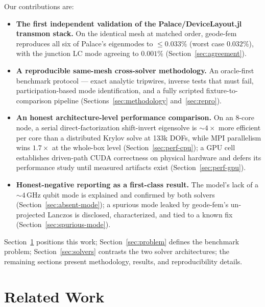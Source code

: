 \documentclass{anvil-paper}
\begin{document}
Our contributions are:
\begin{itemize}
  \item \textbf{The first independent validation of the Palace/DeviceLayout.jl
    transmon stack.} On the identical mesh at matched order, geode-fem
    reproduces all six of Palace's eigenmodes to $\leq 0.033\%$ (worst case
    $0.032\%$), with the junction LC mode agreeing to $0.001\%$
    (Section~\ref{sec:agreement}).
  \item \textbf{A reproducible same-mesh cross-solver methodology.} An
    oracle-first benchmark protocol --- exact analytic tripwires, inverse
    tests that must fail, participation-based mode identification, and a
    fully scripted fixture-to-comparison pipeline
    (Sections~\ref{sec:methodology} and~\ref{sec:repro}).
  \item \textbf{An honest architecture-level performance comparison.} On an
    8-core node, a serial direct-factorization shift-invert eigensolve is
    ${\sim}4\times$ more efficient per core than a distributed Krylov solve
    at 133k DOFs, while MPI parallelism wins $1.7\times$ at the whole-box
    level (Section~\ref{sec:perf-cpu}); a GPU cell establishes driven-path
    CUDA correctness on physical hardware and defers its performance study
    until measured artifacts exist (Section~\ref{sec:perf-gpu}).
  \item \textbf{Honest-negative reporting as a first-class result.} The
    model's lack of a ${\sim}4$\,GHz qubit mode is explained and confirmed
    by both solvers (Section~\ref{sec:absent-mode}); a spurious mode leaked
    by geode-fem's un-projected Lanczos is disclosed, characterized, and
    tied to a known fix (Section~\ref{sec:spurious-mode}).
\end{itemize}

Section~\ref{sec:related} positions this work; Section~\ref{sec:problem}
defines the benchmark problem; Section~\ref{sec:solvers} contrasts the two
solver architectures; the remaining sections present methodology, results,
and reproducibility details.

\section{Related Work}
\label{sec:related}
\end{document}
